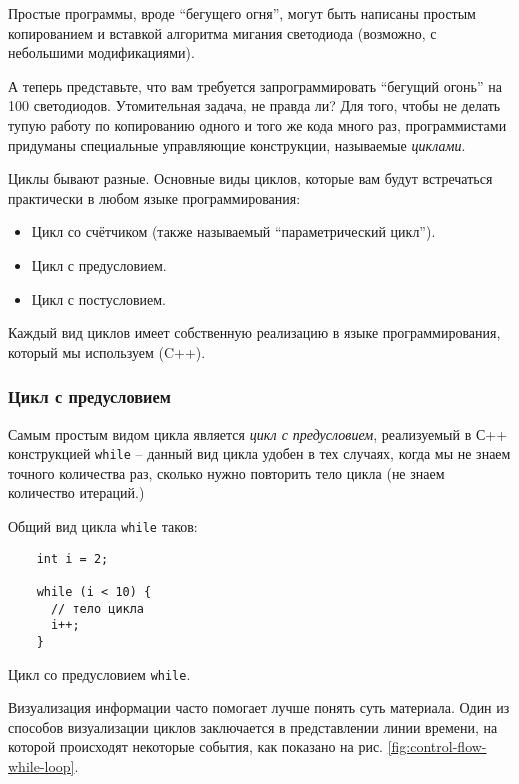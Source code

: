 \documentclass[../sparc.tex]{subfiles}
\begin{document}
Простые программы, вроде ``бегущего огня'', могут быть написаны простым
копированием и вставкой алгоритма мигания светодиода (возможно, с небольшими
модификациями).

А теперь представьте, что вам требуется запрограммировать ``бегущий огонь'' на
100 светодиодов. Утомительная задача, не правда ли? Для того, чтобы не делать
тупую работу по копированию одного и того же кода много раз, программистами
придуманы специальные управляющие конструкции, называемые \emph{циклами}.

Циклы бывают разные. Основные виды циклов, которые вам будут встречаться
практически в любом языке программирования:
\begin{itemize}
\item Цикл со счётчиком (также называемый ``параметрический цикл'').
\item Цикл с предусловием.
\item Цикл с постусловием.
\end{itemize}

Каждый вид циклов имеет собственную реализацию в языке программирования, который
мы используем (C++).

\subsubsection{Цикл с предусловием}

Самым простым видом цикла является \emph{цикл с предусловием}, реализуемый в С++
конструкцией \texttt{while} -- данный вид цикла удобен в тех случаях, когда мы не
знаем точного количества раз, сколько нужно повторить тело цикла (не знаем
количество итераций.)

Общий вид цикла \texttt{while} таков:

\begin{listing}[ht]
  \begin{verbatim}
    int i = 2;

    while (i < 10) {
      // тело цикла
      i++;
    }
  \end{verbatim}
  \label{listing:dialogues-with-computer-while}
  \caption{Цикл со предусловием \texttt{while}.}
\end{listing}

Визуализация информации часто помогает лучше понять суть материала. Один из
способов визуализации циклов заключается в представлении линии времени, на
которой происходят некоторые события, как показано на рис.
\ref{fig:control-flow-while-loop}.
\end{document}
